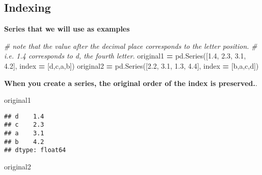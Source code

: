 \documentclass[
]{book}
\newenvironment{Shaded}{\begin{snugshade}}{\end{snugshade}}
\newcommand{\CommentTok}[1]{\textcolor[rgb]{0.56,0.35,0.01}{\textit{#1}}}
\newcommand{\FloatTok}[1]{\textcolor[rgb]{0.00,0.00,0.81}{#1}}
\newcommand{\NormalTok}[1]{#1}
\newcommand{\OperatorTok}[1]{\textcolor[rgb]{0.81,0.36,0.00}{\textbf{#1}}}
\newcommand{\StringTok}[1]{\textcolor[rgb]{0.31,0.60,0.02}{#1}}
\begin{document}
\hypertarget{indexing}{%
\subsection{Indexing}\label{indexing}}

\textbf{Series that we will use as examples}

\begin{Shaded}
\begin{Highlighting}[]
\CommentTok{\# note that the value after the decimal place corresponds to the letter position.}
\CommentTok{\# i.e. 1.4 corresponds to d, the fourth letter.}
\NormalTok{original1 }\OperatorTok{=}\NormalTok{ pd.Series([}\FloatTok{1.4}\NormalTok{, }\FloatTok{2.3}\NormalTok{, }\FloatTok{3.1}\NormalTok{, }\FloatTok{4.2}\NormalTok{], index }\OperatorTok{=}\NormalTok{ [}\StringTok{\textquotesingle{}d\textquotesingle{}}\NormalTok{,}\StringTok{\textquotesingle{}c\textquotesingle{}}\NormalTok{,}\StringTok{\textquotesingle{}a\textquotesingle{}}\NormalTok{,}\StringTok{\textquotesingle{}b\textquotesingle{}}\NormalTok{])}
\NormalTok{original2 }\OperatorTok{=}\NormalTok{ pd.Series([}\FloatTok{2.2}\NormalTok{, }\FloatTok{3.1}\NormalTok{, }\FloatTok{1.3}\NormalTok{, }\FloatTok{4.4}\NormalTok{], index }\OperatorTok{=}\NormalTok{ [}\StringTok{\textquotesingle{}b\textquotesingle{}}\NormalTok{,}\StringTok{\textquotesingle{}a\textquotesingle{}}\NormalTok{,}\StringTok{\textquotesingle{}c\textquotesingle{}}\NormalTok{,}\StringTok{\textquotesingle{}d\textquotesingle{}}\NormalTok{])}
\end{Highlighting}
\end{Shaded}

{\textbf{When you create a series, the original order of the index is preserved.}}.

\begin{Shaded}
\begin{Highlighting}[]
\NormalTok{original1}
\end{Highlighting}
\end{Shaded}

\begin{verbatim}
## d    1.4
## c    2.3
## a    3.1
## b    4.2
## dtype: float64
\end{verbatim}

\begin{Shaded}
\begin{Highlighting}[]
\NormalTok{original2}
\end{Highlighting}
\end{Shaded}
\end{document}
